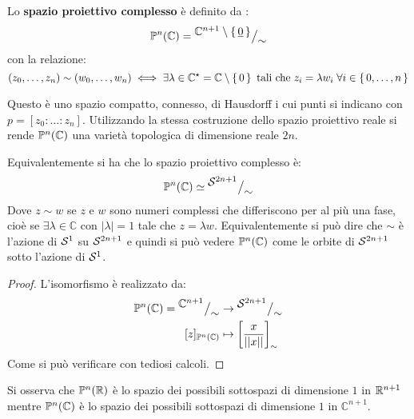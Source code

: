 \begin{definition}
Lo \textbf{spazio proiettivo complesso} è definito da :
\[
  \mathbb{P}^{n} (\mathbb{C}) = {^{\textstyle \mathbb{C}^{n+1} \setminus \set{\underline{0}}}\big/_{\textstyle \sim}}
\]
con la relazione:
\[
  (z_0, \dots, z_n) \sim (w_0, \dots, w_n) \iff \exists \lambda \in \mathbb{C}^\star= \mathbb{C} \setminus \set{0} \text{ tali che } z_i = \lambda w_i \; \forall i \in \set{0, \dots, n}
\]
\end{definition}
Questo è uno spazio compatto, connesso, di Hausdorff i cui punti si indicano con
$ p = [z_0 : \dots : z_n] $. Utilizzando la stessa costruzione dello spazio proiettivo
reale si rende $ \mathbb{P}^{n} (\mathbb{C}) $ una varietà topologica di dimensione reale $ 2n $.
\begin{lemma}
  Equivalentemente si ha che lo spazio proiettivo complesso è:
  \[
    \mathbb{P}^{n} (\mathbb{C}) \simeq {^{\textstyle \mathcal{S}^{2n+1}}\big/_{\textstyle {\sim}}}
  \]
  Dove $ z \sim w $ se $ z $ e $ w $ sono numeri complessi che differiscono per al
  più una fase, cioè se $ \exists \lambda \in \mathbb{C} $ con
  $ | \lambda | = 1 $ tale che $ z = \lambda w $. Equivalentemente si può dire che
  $ \sim $ è l'azione di $ \mathcal{S}^{1} $ su $ \mathcal{S}^{2n+1} $ e quindi si può vedere
  $ \mathbb{P}^{n} (\mathbb{C}) $ come le orbite di $ \mathcal{S}^{2n+1} $ sotto l'azione di $ \mathcal{S}^{1} $.
\end{lemma}
\begin{proof}
  L'isomorfismo è realizzato da:
  \begin{align*}
    \mathbb{P}^{n} (\mathbb{C}) = {^{\textstyle \mathbb{C}^{n+1}}\big/_{\textstyle \sim}} & \to  {^{\textstyle \mathcal{S}^{2n+1}}\big/_{\textstyle \sim}} \\
    [z]_{\mathbb{P}^{n} (\mathbb{C})} & \mapsto \left[\frac{x}{|| x ||}\right]_\sim
  \end{align*}
  Come si può verificare con tediosi calcoli.
\end{proof}
\begin{osservation}
  Si osserva che $ \mathbb{P}^{n} (\mathbb{R}) $ è lo spazio dei possibili sottospazi di dimensione
  $ 1 $ in $ \mathbb{R}^{n+1} $ mentre $ \mathbb{P}^{n} (\mathbb{C}) $ è lo spazio dei possibili sottospazi
  di dimensione $ 1 $ in $ \mathbb{C}^{n+1} $.
\end{osservation}
